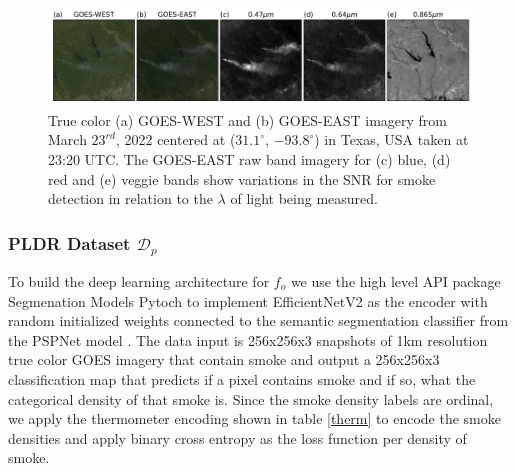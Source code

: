 \documentclass{article}
\begin{document}
\begin{figure}[!htb]
    \centering
    \includegraphics[width=\linewidth]{figures/GOES_WEST_EAST_B_R_V.png}
    \caption{True color (a) GOES-WEST and (b) GOES-EAST imagery from March \(23^{rd}\), 2022 centered at (\(31.1^{\circ}\), \(-93.8^{\circ}\)) in Texas, USA taken at 23:20 UTC. The GOES-EAST raw band imagery for (c) blue, (d) red and (e) veggie bands show variations in the SNR for smoke detection in relation to the \(\lambda\) of light being measured.}\label{WEST_EAST_bands}
\end{figure}

\subsubsection{PLDR Dataset \(\mathcal{D}_p\)} 

To build the deep learning architecture for \(f_o\) we use the high level API package Segmenation Models Pytoch \cite{semantic} to implement EfficientNetV2 \cite{efficientnetv2} as the encoder with random initialized weights connected to the semantic segmentation classifier from the PSPNet model \cite{pspnet}. The data input is 256x256x3 snapshots of 1km resolution true color GOES imagery that contain smoke and output a 256x256x3 classification map that predicts if a pixel contains smoke and if so, what the categorical density of that smoke is. Since the smoke density labels are ordinal, we apply the thermometer encoding shown in table \ref{therm} to encode the smoke densities and apply binary cross entropy as the loss function per density of smoke. 
\end{document}
